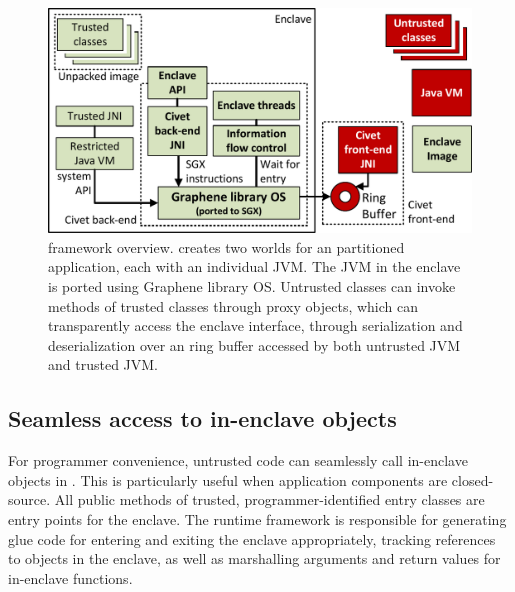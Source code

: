
\begin{figure}[t!]
\centering
\includegraphics[width=\linewidth]{civet/figures/civet-structure.pdf}
\caption{\systemname{} framework overview.
\systemname{} creates two worlds for an partitioned \java{} application, each with an individual JVM.
The JVM in the enclave is ported using Graphene library OS.
Untrusted classes can invoke methods of trusted classes through proxy objects,
which can transparently access the enclave interface, through serialization
and deserialization over an ring buffer accessed by both untrusted JVM and trusted JVM. }
\label{fig:runtime}
\end{figure}


\subsection{Seamless access to in-enclave objects}
\label{sec:concept:accessing}

For programmer convenience, 
untrusted code can seamlessly call in-enclave objects in \systemname{}.
This is particularly useful when application components are closed-source.
All public methods of trusted, programmer-identified entry classes are entry points for the enclave.
The \systemname{} runtime framework is responsible for generating glue code for entering and exiting
the enclave appropriately, tracking references to objects in the enclave, 
as well as marshalling arguments and return values for in-enclave functions.

